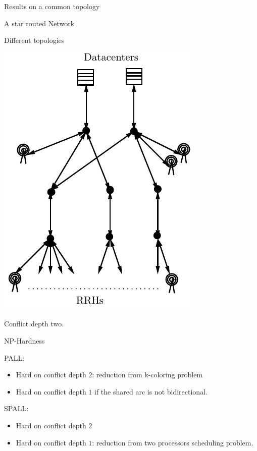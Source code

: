 \documentclass[10 pt]{beamer}
\begin{document}
\begin{section}{Results on a common topology}
\begin{subsection}{A star routed Network}
\begin{frame}{Different topologies}
\begin{multicols}{2}
 
\includegraphics[scale=0.5]{extendendgraphgrey}\\
 \centering

 Conflict depth two.

\end{multicols}
\end{frame}

\begin{frame}{NP-Hardness}
   \begin{multicols}{2}
   PALL:
   \begin{itemize}
   \item Hard on conflict depth $2$: reduction from k-coloring problem
   \item Hard on conflict depth $1$ if the shared arc is not bidirectional.
   \end{itemize}
   
   SPALL:
   \begin{itemize}
    \item Hard on conflict depth $2$ 
       \item Hard on conflict depth $1$: reduction from two processors scheduling problem.
   \end{itemize}
   \end{multicols}

\end{frame}
\end{subsection}



\end{section}
\end{document}

